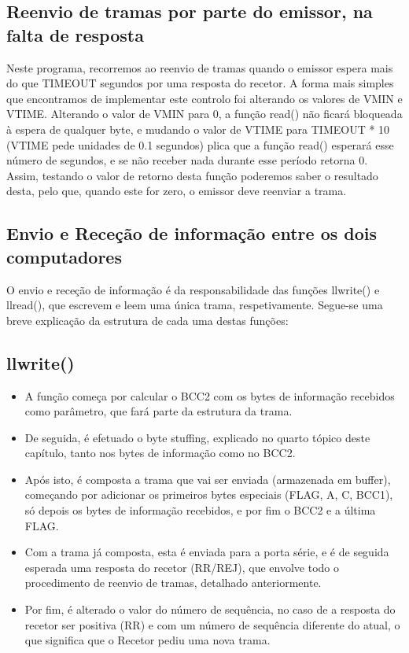 \documentclass[article, a4paper, 11pt, oneside]{memoir}
\begin{document}
\subsection{Reenvio de tramas por parte do emissor, na falta de resposta}
Neste programa, recorremos ao reenvio de tramas quando o emissor espera mais do que 
TIMEOUT segundos por uma resposta do recetor. 
A forma mais simples que encontramos de implementar 
este controlo foi alterando os valores de VMIN e VTIME. 
Alterando o valor de VMIN para 0, a função read() não ficará bloqueada à espera de 
qualquer byte, e mudando o valor de VTIME para TIMEOUT * 10 (VTIME pede unidades de 0.1 segundos) 
plica que a função read() esperará esse número de segundos, e se não receber nada durante 
esse período retorna 0. Assim, testando o valor de retorno desta função poderemos saber 
o resultado desta, pelo que, quando este for zero, o emissor deve reenviar a trama.

\subsection{Envio e Receção de informação entre os dois computadores}
O envio e receção de informação é da responsabilidade das funções llwrite() e llread(), 
que escrevem e leem uma única trama, respetivamente. 
Segue-se uma breve explicação da estrutura de cada uma destas funções:

\subsection{llwrite()}
\begin{itemize}
	\item A função começa por calcular o BCC2 com os bytes de informação recebidos como parâmetro, que fará parte da estrutura da trama.
	\item De seguida, é efetuado o byte stuffing, explicado no quarto tópico deste capítulo, tanto nos bytes de informação como no BCC2.
	\item  Após isto, é composta a trama que vai ser enviada (armazenada em buffer), começando por adicionar os primeiros bytes especiais (FLAG, A, C, BCC1), só depois os bytes de informação recebidos, e por fim o BCC2 e a última FLAG.
	\item Com a trama já composta, esta é enviada para a porta série, e é de seguida esperada uma resposta do recetor (RR/REJ), que envolve todo o procedimento de reenvio de tramas, detalhado anteriormente.
	\item Por fim, é alterado o valor do número de sequência, no caso de a resposta do recetor ser positiva (RR) e com um número de sequência diferente do atual, o que significa que o Recetor pediu uma nova trama.
\end{itemize}
\end{document}
